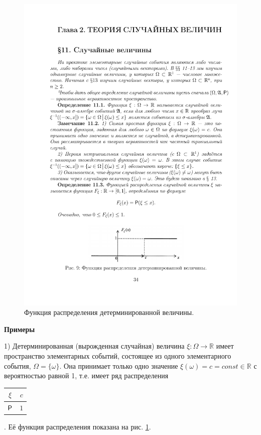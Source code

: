 \begin{figure}[h!]
	\centering
	\includegraphics[]{pic/pic9}
	\caption{Функция распределения детерминированной величины.}
	\label{fig9}
\end{figure}

\textbf{Примеры}

	1) Детерминированная (вырожденная случайная) величина $\xi : \Omega \rightarrow \mathbb{R}$ имеет пространство элементарных событий, состоящее
из одного элементарного события, $\Omega = \{\omega\}$. Она принимает только одно
значение $\xi(\omega)=c=const\in\mathbb{R}$ с вероятностью равной 1, т.е. имеет ряд
распределения 
\begin{tabular}{|c|c|}
\hline
$\xi$ & $c$\\ \hline
$\P$ & $1$\\ \hline
\end{tabular}
. Её функция распределения показана на рис. \ref{fig9}.

